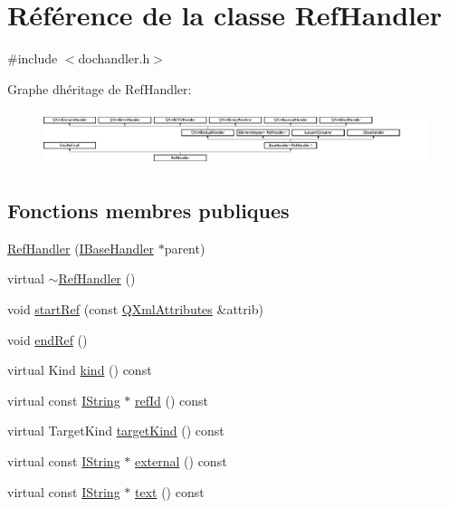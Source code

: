 \hypertarget{class_ref_handler}{}\section{Référence de la classe Ref\+Handler}
\label{class_ref_handler}


{\ttfamily \#include $<$dochandler.\+h$>$}

Graphe d\textquotesingle{}héritage de Ref\+Handler\+:\begin{figure}[H]
\begin{center}
\leavevmode
\includegraphics[height=1.632653cm]{class_ref_handler}
\end{center}
\end{figure}
\subsection*{Fonctions membres publiques}
\begin{DoxyCompactItemize}
\item 
\hyperlink{class_ref_handler_a4a9d65a9d665df590840700367e1bde2}{Ref\+Handler} (\hyperlink{class_i_base_handler}{I\+Base\+Handler} $\ast$parent)
\item 
virtual \hyperlink{class_ref_handler_a0bd94f393271c635309c4d8fe8c7d0b4}{$\sim$\+Ref\+Handler} ()
\item 
void \hyperlink{class_ref_handler_ad83fb3f95a07655c936ec9af140609cf}{start\+Ref} (const \hyperlink{class_q_xml_attributes}{Q\+Xml\+Attributes} \&attrib)
\item 
void \hyperlink{class_ref_handler_a8d591bcf141b0bcba9f63e70beb75f4a}{end\+Ref} ()
\item 
virtual Kind \hyperlink{class_ref_handler_ae1f589b40af183e5280450f80b78f468}{kind} () const 
\item 
virtual const \hyperlink{class_i_string}{I\+String} $\ast$ \hyperlink{class_ref_handler_a2a21606212bf6313f7304b4fab9b980b}{ref\+Id} () const 
\item 
virtual Target\+Kind \hyperlink{class_ref_handler_a88594b2599b60e7dff5ce635ea333abd}{target\+Kind} () const 
\item 
virtual const \hyperlink{class_i_string}{I\+String} $\ast$ \hyperlink{class_ref_handler_a3b4b3756d199f9527f308f3afb939fd6}{external} () const 
\item 
virtual const \hyperlink{class_i_string}{I\+String} $\ast$ \hyperlink{class_ref_handler_a4ec10bba49f536f3747675fb90f21fc4}{text} () const 
\end{DoxyCompactItemize}
